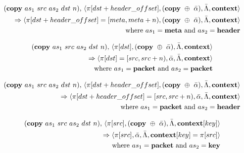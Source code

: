 \documentclass{article}
\begin{document}
\begin{equation}
\begin{split}
  (\textrm{\textbf{copy}} \ as_1 \ src \ as_2 \ dst \ n)
  \textrm{,} \ \langle \pi[dst + header\_offset], (\textrm{\textbf{copy}} \ \oplus \ \bar \alpha), \bar \Lambda, \textrm{\textbf{context}} \rangle \\
  \Rightarrow
  \langle \pi[dst + header\_offset] = [meta, meta + n), (\textrm{\textbf{copy}} \ \oplus \ \bar \alpha), \bar \Lambda, \textrm{\textbf{context}} \rangle \\
    \textrm{where} \ as_1 = \textrm{\textbf{meta} and } as_2 =
    \textrm{\textbf{header}}
\end{split}
\end{equation}

\begin{equation}
\begin{split}
  (\textrm{\textbf{copy}} \ as_1 \ src \ as_2 \ dst \ n)
  \textrm{,} \ \langle \pi[dst], (\textrm{\textbf{copy}} \ \oplus \ \bar \alpha), \bar \Lambda, \textrm{\textbf{context}} \rangle \\
  \Rightarrow 
  \langle \pi[dst] = [src, src + n), \bar \alpha, \bar \Lambda, \textrm{\textbf{context}} \rangle \\
    \textrm{where} \ as_1 = \textrm{\textbf{packet} and } as_2 =
    \textrm{\textbf{packet}}
\end{split}
\end{equation}

\begin{equation}
\begin{split}
  (\textrm{\textbf{copy}} \ as_1 \ src \ as_2 \ dst \ n)
  \textrm{,} \ \langle \pi[dst + header\_offset], (\textrm{\textbf{copy}} \ \oplus \ \bar \alpha), \bar \Lambda, \textrm{\textbf{context}} \rangle \\
  \Rightarrow
  \langle \pi[dst + header\_offset] = [src, src + n), \bar \alpha, \bar \Lambda, \textrm{\textbf{context}} \rangle \\
    \textrm{where} \ as_1 = \textrm{\textbf{packet} and } as_2 =
    \textrm{\textbf{header}}
\end{split}
\end{equation}

\begin{equation}
\begin{split}
  (\textrm{\textbf{copy}} \ as_1 \ src \ as_2 \ dst \ n)
  \textrm{,} \ \langle \pi[src], (\textrm{\textbf{copy}} \ \oplus \ \bar \alpha), \bar \Lambda, \textrm{\textbf{context}}[key] \rangle \\
  \Rightarrow
  \langle \pi[src], \bar \alpha, \bar \Lambda, \textrm{\textbf{context}}[key] = \pi[src] \rangle \\
    \textrm{where} \ as_1 = \textrm{\textbf{packet} and } as_2 =
    \textrm{\textbf{key}}
\end{split}
\end{equation}
\end{document}
